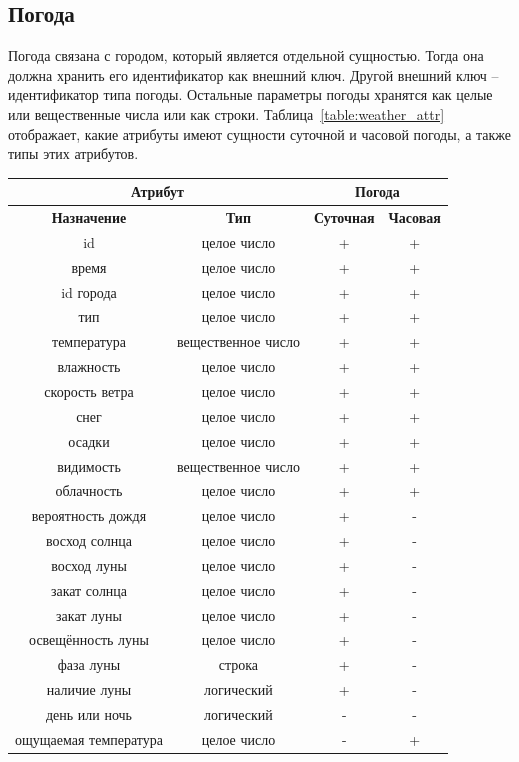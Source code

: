 \subsection*{Погода}
Погода связана с городом, который является отдельной сущностью.
Тогда она должна хранить его идентификатор как внешний ключ.
Другой внешний ключ -- идентификатор типа погоды.
Остальные параметры погоды хранятся как целые или вещественные числа или как строки.
Таблица~\ref{table:weather_attr} отображает, какие атрибуты имеют сущности суточной и часовой погоды, а также типы этих атрибутов.

\begin{table}[h!]
    \centering
    \begin{tabular}{ |c|c|c|c| }
        \hline
        \multicolumn{2}{|c|}{Атрибут} & \multicolumn{2}{|c|}{Погода}  \\
        \hline
            \textbf{Назначение} & \textbf{Тип} & \textbf{Суточная} & \textbf{Часовая} \\
        \hline
            id & целое число & + & + \\
        \hline
            время & целое число & + & + \\
        \hline
            id города & целое число & + & + \\
        \hline
            тип & целое число & + & + \\
        \hline
            температура & вещественное число & + & + \\
        \hline
            влажность & целое число & + & + \\
        \hline
            скорость ветра & целое число & + & + \\
        \hline
             снег & целое число & + & + \\
        \hline
             осадки & целое число & + & + \\
        \hline
             видимость & вещественное число & + & + \\
        \hline
             облачность & целое число & + & + \\
        \hline
             вероятность дождя & целое число & + & - \\
        \hline
             восход солнца & целое число & + & - \\
        \hline
             восход луны & целое число & + & - \\
        \hline
             закат солнца & целое число & + & - \\
        \hline
             закат луны & целое число & + & - \\
        \hline
             освещённость луны & целое число & + & - \\
        \hline
             фаза луны & строка & + & - \\
        \hline
             наличие луны & логический & + & - \\
        \hline
            день или ночь & логический & - & - \\
        \hline
            ощущаемая температура & целое число & - & + \\
        \hline
            

\end{tabular}
\end{table}
